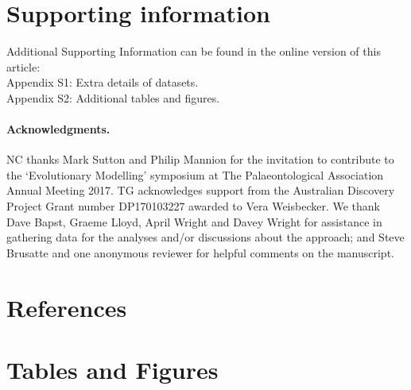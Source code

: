 \documentclass[12pt,a4paper]{article}
\begin{document}
\section{Supporting information}
Additional Supporting Information can be found in the online version of this article:\\
Appendix S1: Extra details of datasets. \\
Appendix S2: Additional tables and figures.

\paragraph{Acknowledgments.}
  NC thanks Mark Sutton and Philip Mannion for the invitation to contribute to the `Evolutionary Modelling' symposium at The Palaeontological Association Annual Meeting 2017.
  TG acknowledges support from the Australian Discovery Project Grant number DP170103227 awarded to Vera Weisbecker.
  We thank Dave Bapst, Graeme Lloyd, April Wright and Davey Wright for assistance in gathering data for the analyses and/or discussions about the approach; and Steve Brusatte and one anonymous reviewer for helpful comments on the manuscript.

\section{References}

 
 

\newpage
\section{Tables and Figures}

\begin{landscape}
 
\end{landscape}

  
\end{document}
